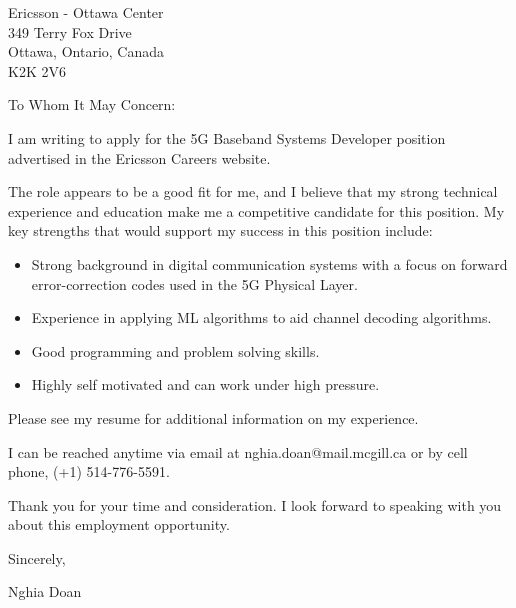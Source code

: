 \documentclass[]{letter}
\begin{document}
	
	\begin{letter}{ Ericsson - Ottawa Center\\
			349 Terry Fox Drive \\	
			Ottawa, Ontario, Canada \\
			K2K 2V6}
		\address{Nghia Doan\\ 3455 Rue Durocher, Apt\# 108 \\ Montreal, QC, Canada\\ H2X 2C9 \\ Email: nghia.doan@mail.mcgill.ca \\ Phone: +1 514-776-5591}
		
		\opening{To Whom It May Concern:}
		
		I am writing to apply for the 5G Baseband Systems Developer position advertised in the Ericsson Careers website.
		
		The role appears to be a good fit for me, and I believe that my strong technical experience and education make me a competitive candidate for this position. My key strengths that would support my success in this position include:
		
		\begin{itemize}
			\item Strong background in digital communication systems with a focus on forward error-correction codes used in the 5G Physical Layer.
			\item Experience in applying ML algorithms to aid channel decoding algorithms.
			\item Good programming and problem solving skills.
			\item Highly self motivated and can work under high pressure.
		\end{itemize}
		
		Please see my resume for additional information on my experience.
		
		I can be reached anytime via email at nghia.doan@mail.mcgill.ca or by cell phone, (+1) 514-776-5591.
		
		Thank you for your time and consideration. I look forward to speaking with you about this employment opportunity.
		
		\vspace*{30pt}
		Sincerely,	
		
		Nghia Doan
		\signature{Nghia Doan}
		
		
		
	\end{letter}
\end{document}
